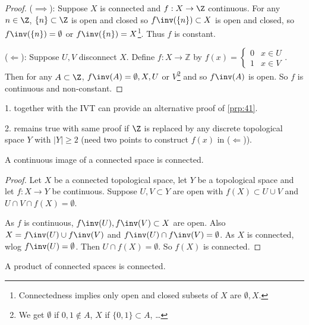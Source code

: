 \begin{proof}
    ($\implies$): Suppose $X$ is connected and $f:X\to \Z$ continuous. For any $n\in \Z$, $\set{n}\subset \Z$ is open and closed so $f\inv(\set{n})\subset X$ is open and closed, so $f\inv(\set{n})= \emptyset$ or $f\inv(\set{n}) = X$\footnote{Connectedness implies only open and closed subsets of $X$ are $\emptyset, X$.}. Thus $f$ is constant.

    ($\Longleftarrow$): Suppose $U,V$ disconnect $X$. Define $f:X \to \mathbb{Z}$ by $f(x) = \begin{cases}
        0 & x \in U \\
        1 & x \in V
    \end{cases}$. 
    Then for any $A\subset \Z$, $f\inv(A) = \emptyset,X,U$ or $V$\footnote{We get $\emptyset$ if $0, 1 \notin A$, $X$ if $\{0, 1\} \subset A$, \dots} and so $f\inv(A)$ is open. So $f$ is continuous and non-constant.
    \end{proof}

    \begin{remark}
    1.  together with the IVT can provide an alternative proof of \cref{prp:41}.

    2.  remains true with same proof if $\Z$ is replaced by any discrete topological space $Y$ with $|Y| \geq 2$ (need two points to construct $f(x)$ in ($\Longleftarrow$)).
\end{remark}

\begin{proposition} \label{prp:43}
    A continuous image of a connected space is connected.
\end{proposition}

\begin{proof}
    Let $X$ be a connected topological space, let $Y$ be a topological space and let $f:X\to Y$ be continuous. Suppose $U,V\subset Y$ are open with $f(X)\subset U\cup V$ and $U\cap V\cap f(X) = \emptyset$.

    As $f$ is continuous, $f\inv(U),f\inv(V)\subset X$ are open. Also $X = f\inv(U)\cup f\inv(V)$ and $f\inv(U) \cap f\inv(V)=\emptyset$. As $X$ is connected, wlog $f\inv(U)= \emptyset$. Then $U \cap f(X)=\emptyset$. So $f(X)$ is connected.
\end{proof}

\begin{proposition} \label{prp:44}
    A product of connected spaces is connected.
\end{proposition}

